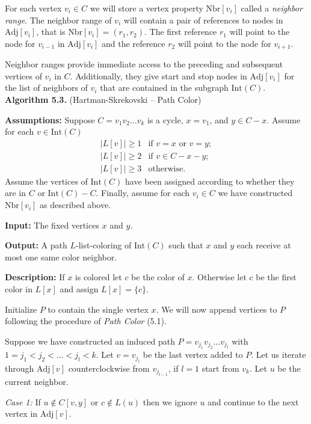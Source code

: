\documentclass[letterpaper, 12pt]{article}
\theoremstyle{definition}
\theoremstyle{definition}
\theoremstyle{thm}
\theoremstyle{definition}
\begin{document}
For each vertex $v_i\in C$ we will store a vertex property $\text{Nbr}[v_i]$
called a \textit{neighbor range}. The neighbor range of $v_i$ will contain a pair of
references to nodes in $\text{Adj}[v_i]$, that is $\text{Nbr}[v_i]=(r_1,r_2)$.
The first reference $r_1$ will point to the
node for $v_{i-1}$ in $\text{Adj}[v_i]$ and the reference $r_2$ will point to
the node for $v_{i+1}$.

Neighbor ranges provide immediate access to the preceding and subsequent
vertices of $v_i$ in $C$. Additionally, they give start and stop nodes in
$\text{Adj}[v_i]$ for the list of neighbors of $v_i$ that are contained in the
subgraph $\text{Int}(C)$.\\

\noindent\textbf{Algorithm 5.3.} (Hartman-Skrekovski -- Path Color)

\noindent\textbf{Assumptions:} Suppose $C=v_1v_2\ldots v_k$ is a cycle, $x=v_1$,
and $y\in C-x$. Assume for each $v\in \text{Int}(C)$
\[
    \begin{array}{ll}
	    |L[v]|\ge 1 & \text{if } v=x \text{ or } v=y;\\
	    |L[v]|\ge 2 & \text{if } v\in C-x-y;\\
	    |L[v]|\ge 3 & \text{otherwise.}
    \end{array}
\]
Assume the vertices of
$\text{Int}(C)$ have been assigned according to whether they are in $C$ or
$\text{Int}(C)-C$. Finally, assume for each $v_i\in C$ we have constructed
$\text{Nbr}[v_i]$ as described above.

\noindent\textbf{Input:} The fixed vertices $x$ and $y$.

\noindent\textbf{Output:} A path $L$-list-coloring of $\text{Int}(C)$ such that
$x$ and $y$ each receive at most one same color neighbor.

\noindent\textbf{Description:} If $x$ is colored let $c$ be the color of $x$.
Otherwise let $c$ be the first color in $L[x]$ and assign
$L[x]=\{c\}$.

Initialize $P$ to contain the single vertex $x$. We will now
append vertices to $P$ following the procedure of \textit{Path Color} (5.1).

Suppose we have constructed an induced path $P=v_{j_1}v_{j_2}\ldots v_{j_l}$
with $1=j_1<j_2<\ldots<j_l< k$. Let $v=v_{j_l}$ be the last vertex added to $P$.
Let us iterate through $\text{Adj}[v]$ counterclockwise from $v_{j_{l-1}}$, if
$l=1$ start from $v_k$. Let $u$ be the current neighbor.

\textit{Case 1:} If $u\not\in C[v,y]$ or $c\not\in L(u)$ then we ignore $u$ and
continue to the next vertex in $\text{Adj}[v]$.
\end{document}
